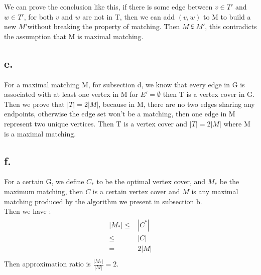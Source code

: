 \documentclass[oneside]{homework} %
\begin{document}
We can prove the conclusion like this, if there is some edge between $v \in T'$ and $w \in T'$, for both $v$ and $w$ are not in T, then we can add $(v,w)$ to M to build a new $M'$without breaking the property of matching. Then $ M \subsetneqq M'$, this contradicts the assumption that M is maximal matching.

\subsection*{e.}
For a maximal matching M, for subsection d, we know that every edge in G is associated with at least one vertex in M for $E' = \emptyset$ then T is a vertex cover in G.\\
Then we prove that $|T| = 2|M|$, because in M, there are no two edges sharing any endpoints, otherwise the edge set won't be a matching, then one edge in M represent two unique vertices. 
Then T is a vertex cover and $|T| = 2|M|$ where M is a maximal matching.


\subsection*{f.}
For a certain G, we define $C_{*}$ to be the optimal vertex cover, and $M_{*}$ be the maximum matching, then $C$ is a certain vertex cover and $M$ is any maximal matching produced by the algorithm we present in subsection b. \\
Then we have :
\begin{eqnarray*}
  \begin{split}
	|M_{*}| \leq& |C^{*}| \\
	        \leq& |C| \\
	        =& 2|M|  \\
  \end{split}
\end{eqnarray*}
Then approximation ratio is $\frac{|M_{*}|}{|M|} = 2$.
\end{document}

